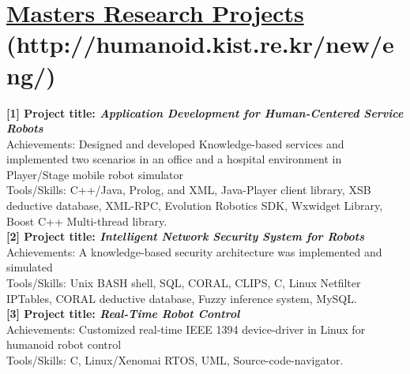 \documentclass[notopicbreak,contbibnum,plain]{simplecv}
\begin{document}
\section{\textbf{\underline{Masters Research Projects}} (http://humanoid.kist.re.kr/new/eng/)}
\vspace*{-0.3cm}
\textbf{[1] Project title: \textit{Application Development for Human-Centered Service Robots}}\\
Achievements: Designed and developed Knowledge-based services and implemented two scenarios in an office and a hospital environment in Player/Stage mobile robot simulator\\
Tools/Skills: C++/Java, Prolog, and XML, Java-Player client library, XSB deductive database, XML-RPC, Evolution Robotics SDK, Wxwidget Library, Boost C++ Multi-thread library.\\
\textbf{[2] Project title: \textit{Intelligent Network Security System for Robots}}\\
Achievements: A knowledge-based security architecture was implemented and simulated\\
Tools/Skills: Unix BASH shell, SQL, CORAL, CLIPS, C, Linux Netfilter IPTables, CORAL deductive database, Fuzzy inference system, MySQL.\\
\textbf{[3] Project title:\textit{ Real-Time Robot Control}}\\
Achievements: Customized real-time IEEE 1394 device-driver in Linux for humanoid robot control\\
Tools/Skills: C, Linux/Xenomai RTOS, UML, Source-code-navigator.
\vspace*{-0.3cm}
\end{document}
